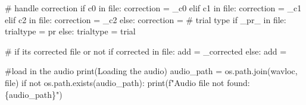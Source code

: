 \documentclass[
  letterpaper,
  DIV=11,
  numbers=noendperiod]{scrreprt}
\newenvironment{Shaded}{\begin{snugshade}}{\end{snugshade}}
\newcommand{\BuiltInTok}[1]{\textcolor[rgb]{0.00,0.23,0.31}{#1}}
\newcommand{\CommentTok}[1]{\textcolor[rgb]{0.37,0.37,0.37}{#1}}
\newcommand{\ControlFlowTok}[1]{\textcolor[rgb]{0.00,0.23,0.31}{#1}}
\newcommand{\KeywordTok}[1]{\textcolor[rgb]{0.00,0.23,0.31}{#1}}
\newcommand{\NormalTok}[1]{\textcolor[rgb]{0.00,0.23,0.31}{#1}}
\newcommand{\OperatorTok}[1]{\textcolor[rgb]{0.37,0.37,0.37}{#1}}
\newcommand{\SpecialCharTok}[1]{\textcolor[rgb]{0.37,0.37,0.37}{#1}}
\newcommand{\SpecialStringTok}[1]{\textcolor[rgb]{0.13,0.47,0.30}{#1}}
\newcommand{\StringTok}[1]{\textcolor[rgb]{0.13,0.47,0.30}{#1}}
\begin{document}
\begin{Shaded}
\begin{Highlighting}[]
    \CommentTok{\# handle correction}
    \ControlFlowTok{if} \StringTok{\textquotesingle{}c0\textquotesingle{}} \KeywordTok{in} \BuiltInTok{file}\NormalTok{:}
\NormalTok{        correction }\OperatorTok{=} \StringTok{\textquotesingle{}\_c0\textquotesingle{}}
    \ControlFlowTok{elif} \StringTok{\textquotesingle{}c1\textquotesingle{}} \KeywordTok{in} \BuiltInTok{file}\NormalTok{:}
\NormalTok{        correction }\OperatorTok{=} \StringTok{\textquotesingle{}\_c1\textquotesingle{}}
    \ControlFlowTok{elif} \StringTok{\textquotesingle{}c2\textquotesingle{}} \KeywordTok{in} \BuiltInTok{file}\NormalTok{:}
\NormalTok{        correction }\OperatorTok{=} \StringTok{\textquotesingle{}\_c2\textquotesingle{}}
    \ControlFlowTok{else}\NormalTok{:}
\NormalTok{        correction }\OperatorTok{=} \StringTok{\textquotesingle{}\textquotesingle{}}
    \CommentTok{\# trial type}
    \ControlFlowTok{if} \StringTok{\textquotesingle{}\_pr\_\textquotesingle{}} \KeywordTok{in} \BuiltInTok{file}\NormalTok{:}
\NormalTok{        trialtype }\OperatorTok{=} \StringTok{\textquotesingle{}pr\textquotesingle{}}
    \ControlFlowTok{else}\NormalTok{:}
\NormalTok{        trialtype }\OperatorTok{=} \StringTok{\textquotesingle{}trial\textquotesingle{}}

    \CommentTok{\# if it\textquotesingle{}s corrected file or not}
    \ControlFlowTok{if} \StringTok{\textquotesingle{}corrected\textquotesingle{}} \KeywordTok{in} \BuiltInTok{file}\NormalTok{:}
\NormalTok{        add }\OperatorTok{=} \StringTok{\textquotesingle{}\_corrected\textquotesingle{}}
    \ControlFlowTok{else}\NormalTok{:}
\NormalTok{        add }\OperatorTok{=} \StringTok{\textquotesingle{}\textquotesingle{}}

    \CommentTok{\#load in the audio}
    \BuiltInTok{print}\NormalTok{(}\StringTok{\textquotesingle{}Loading the audio\textquotesingle{}}\NormalTok{)}
\NormalTok{    audio\_path }\OperatorTok{=}\NormalTok{ os.path.join(wavloc, }\BuiltInTok{file}\NormalTok{)}
    \ControlFlowTok{if} \KeywordTok{not}\NormalTok{ os.path.exists(audio\_path):}
        \BuiltInTok{print}\NormalTok{(}\SpecialStringTok{f"Audio file not found: }\SpecialCharTok{\{}\NormalTok{audio\_path}\SpecialCharTok{\}}\SpecialStringTok{"}\NormalTok{)}


\end{Highlighting}
\end{Shaded}
\end{document}
